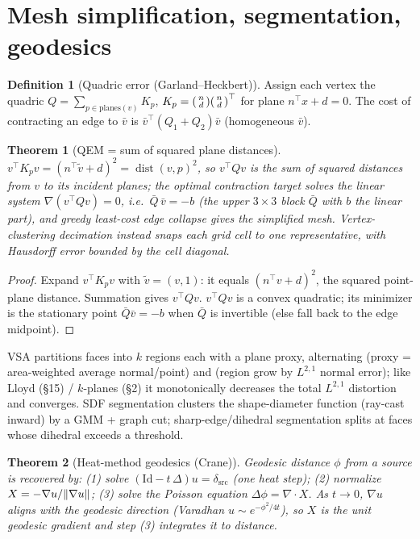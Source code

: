 \documentclass[11pt]{article}
\theoremstyle{definition}\newtheorem{definition}{Definition}[section]
\theoremstyle{plain}\newtheorem{theorem}{Theorem}[section]
\begin{document}
\section{Mesh simplification, segmentation, geodesics}
\begin{definition}[Quadric error (Garland--Heckbert)]
Assign each vertex the quadric $Q=\sum_{p\in\text{planes}(v)} K_p$, $K_p=\begin{psmallmatrix}n\\d\end{psmallmatrix}
\begin{psmallmatrix}n\\d\end{psmallmatrix}^\top$ for plane $n^\top x+d=0$. The cost of contracting an edge to
$\bar v$ is $\bar v^\top(Q_1+Q_2)\bar v$ (homogeneous $\bar v$).
\end{definition}
\begin{theorem}[QEM = sum of squared plane distances]\label{thm:qem}
$v^\top K_p v=(n^\top \tilde v+d)^2=\operatorname{dist}(v,p)^2$, so $v^\top Q v$ is the sum of squared
distances from $v$ to its incident planes; the optimal contraction target solves the linear system
$\nabla(v^\top Q v)=0$, i.e.\ $\bar Q\,\bar v=-b$ (the upper $3\times3$ block $\bar Q$ with $b$ the linear
part), and greedy least-cost edge collapse gives the simplified mesh. Vertex-clustering decimation instead
snaps each grid cell to one representative, with Hausdorff error bounded by the cell diagonal.
\end{theorem}
\begin{proof}
Expand $v^\top K_p v$ with $\tilde v=(v,1)$: it equals $(n^\top v+d)^2$, the squared point-plane distance.
Summation gives $v^\top Q v$. $v^\top Q v$ is a convex quadratic; its minimizer is the stationary point
$\bar Q\bar v=-b$ when $\bar Q$ is invertible (else fall back to the edge midpoint).
\end{proof}
\begin{proposition}
VSA partitions faces into $k$ regions each with a plane proxy, alternating (proxy = area-weighted average
normal/point) and (region grow by $L^{2,1}$ normal error); like Lloyd (\S15) / $k$-planes (\S2) it
monotonically decreases the total $L^{2,1}$ distortion and converges. SDF segmentation clusters the
shape-diameter function (ray-cast inward) by a GMM + graph cut; sharp-edge/dihedral segmentation splits at
faces whose dihedral exceeds a threshold.
\end{proposition}
\begin{theorem}[Heat-method geodesics (Crane)]\label{thm:heat}
Geodesic distance $\phi$ from a source is recovered by: (1) solve $(\mathrm{Id}-t\,\Delta)u=\delta_{\text{src}}$
(one heat step); (2) normalize $X=-\nabla u/\lVert \nabla u\rVert$; (3) solve the Poisson equation
$\Delta\phi=\nabla\cdot X$. As $t\to0$, $\nabla u$ aligns with the geodesic direction (Varadhan
$u\sim e^{-\phi^2/4t}$), so $X$ is the unit geodesic gradient and step (3) integrates it to distance.
\end{theorem}
\end{document}
